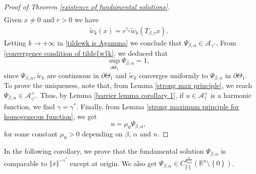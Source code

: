 \documentclass[10pt, leqno]{article}
\theoremstyle{definition}
\theoremstyle{remark}
\numberwithin{equation}{section}
\begin{document}
\begin{proof}[Proof of Theorem \ref{existence of fundamental solutions}]
\begin{eqnarray}
\end{eqnarray}
Given $x\neq 0$ and $r >0$ we have
\begin{eqnarray}
\label{tildewk is Agamma}
\tilde{w}_{k}(x) = r^{\gamma_{k}} \tilde{w}_{k}\left(T_{\beta,r}x \right).
\end{eqnarray}
Letting $k\rightarrow + \infty$ in \eqref{tildewk is Agamma} we conclude that $\Psi_{\beta, \alpha} \in \mathcal{A}_{\gamma^{\ast}}$. From \eqref{convergence condition of tilde{w}k}, we deduced that
$$
\displaystyle\sup_{\partial \Theta_{1}}\Psi_{\beta, \alpha} = 1,
$$
since $\Psi_{\beta, \alpha}, \tilde{w}_{k}$ are continuous in $\partial \Theta_{1}$ and $\tilde{w}_{k}$ converges uniformly to $\Psi_{\beta, \alpha}$ in $\partial \Theta_{1}$.
To prove the uniqueness, note that, from Lemma \ref{strong max principle}, we reach $\Psi_{\beta, \alpha} \in \mathcal{A}^{+}_{\gamma^{\ast}}$. Thus, by Lemma \ref{barrier lemma corollary 1}, if $u \in \mathcal{A}^{+}_{\gamma}$ is a harmonic function, we find $\gamma = \gamma^{\ast}$. Finally, from Lemma \ref{strong maximum principle for homogeneous function}, we get
$$
u = \mu_{0}  \Psi_{\beta, \alpha},
$$
for some constant $\mu_{0} >0$ depending on $\beta$, $\alpha$ and $n$.
\end{proof}
In the following corollary, we prove that the fundamental solution $\Psi_{\beta, \alpha}$ is comparable to $\Vert x \Vert^{-\gamma^{\ast}}$ except at origin. We also get $\Psi_{\beta, \alpha} \in C^{\frac{2}{b_{\max}}}_{\Vert \cdot \Vert}\left(\mathbb{R}^{n} \setminus \left\lbrace 0 \right\rbrace  \right)$.
\end{document}
